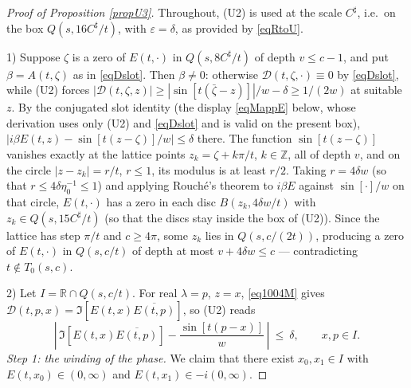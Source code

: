 \documentclass[11pt,twoside,reqno]{amsart}
\def\R{{\mathbb R}}
\def\Z{{\mathbb{Z}}}
\def\e{\varepsilon}
\def\d{\delta}
\def\l{\lambda}
\def\b{\beta}
\theoremstyle{plain}
\numberwithin{equation}{section}
\begin{document}
\begin{proof}[Proof of Proposition \ref{propU3}]
Throughout, (U2) is used at the scale $C^\sharp$, i.e.\ on the box $Q(s,16C^\sharp/t)$, with $\e=\d$, as provided by \eqref{eqRtoU}.

1) Suppose $\zeta$ is a zero of $E(t,\cdot)$ in $Q(s,8C^\sharp/t)$ of depth $v\leq c-1$, and put $\b=A(t,\zeta)$ as in \eqref{eqDslot}. Then $\b\neq0$: otherwise ${\mathcal D}(t,\zeta,\cdot)\equiv0$ by \eqref{eqDslot}, while (U2) forces $|{\mathcal D}(t,\zeta,z)|\geq|\sin[t(\bar\zeta-z)]|/w-\d\geq1/(2w)$ at suitable $z$. By the conjugated slot identity (the display \eqref{eqMappE} below, whose derivation uses only (U2) and \eqref{eqDslot} and is valid on the present box), $|i\b E(t,z)-\sin[t(z-\zeta)]/w|\leq\d$ there. The function $\sin[t(z-\zeta)]$ vanishes exactly at the lattice points $z_k=\zeta+k\pi/t$, $k\in\Z$, all of depth $v$, and on the circle $|z-z_k|=r/t$, $r\leq1$, its modulus is at least $r/2$. Taking $r=4\d w$ (so that $r\leq4\d\eta_0^{-1}\leq1$) and applying Rouch\'e's theorem to $i\b E$ against $\sin[\cdot]/w$ on that circle, $E(t,\cdot)$ has a zero in each disc $B(z_k,4\d w/t)$ with $z_k\in Q(s,15C^\sharp/t)$ (so that the discs stay inside the box of (U2)). Since the lattice has step $\pi/t$ and $c\geq4\pi$, some $z_k$ lies in $Q(s,c/(2t))$, producing a zero of $E(t,\cdot)$ in $Q(s,c/t)$ of depth at most $v+4\d w\leq c$ --- contradicting $t\notin T_0(s,c)$. 

2) Let $I=\R\cap Q(s,c/t)$. For real $\l=p$, $z=x$, \eqref{eq1004M} gives ${\mathcal D}(t,p,x)=\Im\left[E(t,x)\overline{E(t,p)}\right]$, so (U2) reads
\begin{equation}
\left|\,\Im\left[E(t,x)\overline{E(t,p)}\right]-\frac{\sin[t(p-x)]}{w}\,\right|\ \leq\ \d,\qquad x,p\in I .
\label{eqRealPair}
\end{equation}
{\it Step 1: the winding of the phase.} We claim that there exist $x_0,x_1\in I$ with $E(t,x_0)\in(0,\infty)$ and $E(t,x_1)\in-i(0,\infty)$.


\end{proof}
\end{document}
